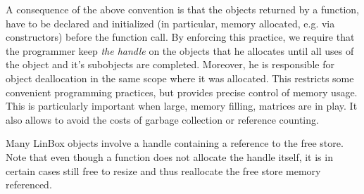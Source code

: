 \documentclass{article}
\newcommand{\linbox}{{\sc LinBox}\xspace}
\begin{document}
A consequence of the above convention is that the objects returned by
a function,
have to be declared and initialized (in particular, memory allocated, e.g. via constructors) before the
function call.
By enforcing this
practice, we require that the programmer keep 
\textit{the handle} on the
objects that he allocates until all uses of the object and it's subobjects are completed. Moreover, he is responsible for object 
deallocation in the same 
scope where it was allocated. 
This restricts some convenient programming practices, but provides precise control of memory usage.
This is particularly important when large, memory filling, matrices
are in play.
It also allows to avoid the costs of garbage 
collection or reference counting.

Many \linbox objects involve a handle containing a reference to the free store.
Note that even though a function does not allocate the handle itself,
it is in certain cases still free to resize and thus reallocate the free store memory referenced.
\end{document}
